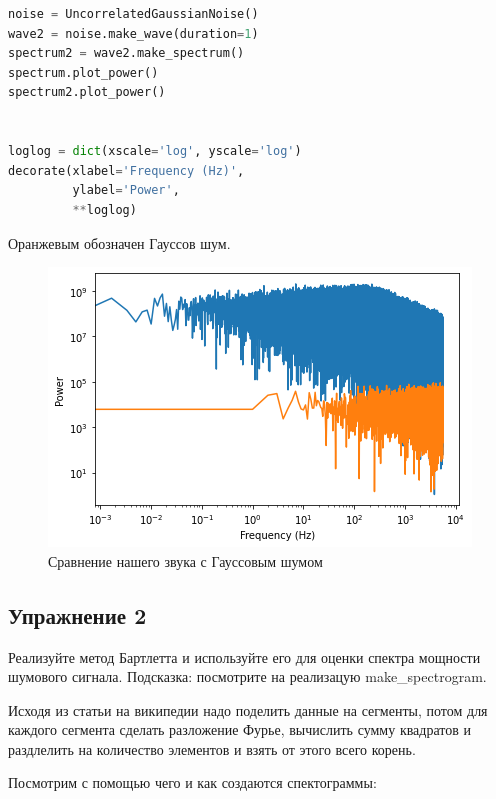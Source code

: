 \begin{lstlisting}[language=Python]
noise = UncorrelatedGaussianNoise()
wave2 = noise.make_wave(duration=1)
spectrum2 = wave2.make_spectrum()
spectrum.plot_power()
spectrum2.plot_power()


loglog = dict(xscale='log', yscale='log')
decorate(xlabel='Frequency (Hz)',
         ylabel='Power', 
         **loglog)
\end{lstlisting}

Оранжевым обозначен Гауссов шум.

\begin{figure}[H]
	\begin{center}
		\includegraphics[scale=1]{fig/lab04/lab04_14_0.png}
		\caption{Сравнение нашего звука с Гауссовым шумом}
	\end{center}
\end{figure}

\subsection{Упражнение 2}

Реализуйте метод Бартлетта\cite{barlett} и используйте его для оценки спектра мощности шумового сигнала. Подсказка: посмотрите на реализацую make\_spectrogram.

Исходя из статьи на википедии надо поделить данные на сегменты, потом для каждого сегмента сделать разложение Фурье, вычислить сумму квадратов и раздлелить на количество элементов и взять от этого всего корень.

Посмотрим с помощью чего и как создаются спектограммы:

